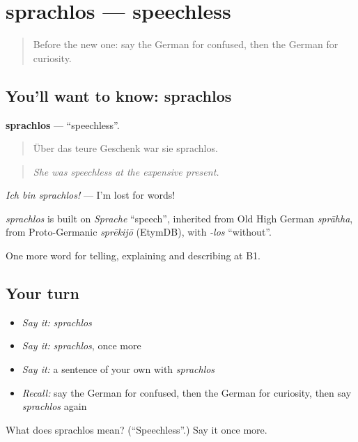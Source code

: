 \section[sprachlos]{sprachlos — speechless}

\label{lesson:GE-C474-sprachlos}



\begin{quote}
Before the new one: say the German for confused, then the German for curiosity.
\end{quote}

\subsection*{You'll want to know: sprachlos}
\textbf{sprachlos} — \textquotedblleft{}speechless\textquotedblright{}.

\begin{quote}
Über das teure Geschenk war sie sprachlos.
\end{quote}

\begin{quote}
\emph{She was speechless at the expensive present.}
\end{quote}

\emph{Ich bin sprachlos!} — I'm lost for words!

\begin{cousinweb}
\emph{sprachlos} is built on \emph{Sprache} \textquotedblleft{}speech\textquotedblright{}, inherited from Old High German \emph{sprāhha}, from Proto-Germanic \emph{sprēkijō} (EtymDB), with \emph{-los} \textquotedblleft{}without\textquotedblright{}.
\end{cousinweb}

\begin{grammarlens}[title={What you've built}]
One more word for telling, explaining and describing at B1.
\end{grammarlens}

\subsection*{Your turn}
\begin{itemize}
\raggedright
  \item \emph{Say it:} \emph{sprachlos}
  \item \emph{Say it:} \emph{sprachlos}, once more
  \item \emph{Say it:} a sentence of your own with \emph{sprachlos}
  \item \emph{Recall:} say the German for confused, then the German for curiosity, then say \emph{sprachlos} again
\end{itemize}

\begin{tcolorbox}[breakable,colback=teal!4,colframe=teal!35!black,title={Before you move on}]
What does sprachlos mean? (\textquotedblleft{}Speechless\textquotedblright{}.) Say it once more.
\end{tcolorbox}
